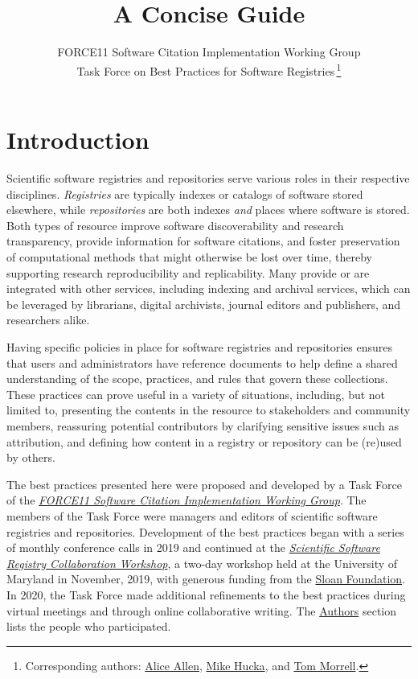 \documentclass[11pt]{article}
\title{\textls[-27]{Nine Best Practices for Research Software Registries and Repositories:}\\
A Concise Guide}
\author{FORCE11 Software Citation Implementation Working Group\\
Task Force on Best Practices for Software Registries$\,$\footnote{Corresponding authors: \href{mailto:aallen@ascl.net}{Alice Allen}, \href{mailto:mhucka@caltech.edu}{Mike Hucka}, and \href{mailto:tmorrell@library.caltech.edu}{Tom Morrell}.}}
\begin{document}
\maketitle
\thispagestyle{empty} %
\tableofcontents

\newcommand{\sectionbreak}{\clearpage}


\section{Introduction}
\label{introduction}

Scientific software registries and repositories serve various roles in their respective disciplines. \emph{Registries} are typically indexes or catalogs of software stored elsewhere, while \emph{repositories} are both indexes \emph{and} places where software is stored. Both types of resource improve software discoverability and research transparency, provide information for software citations, and foster preservation of computational methods that might otherwise be lost over time, thereby supporting research reproducibility and replicability. Many provide or are integrated with other services, including indexing and archival services, which can be leveraged by librarians, digital archivists, journal editors and publishers, and researchers alike.

Having specific policies in place for software registries and repositories ensures that users and administrators have reference documents to help define a shared understanding of the scope, practices, and rules that govern these collections. These practices can prove useful in a variety of situations, including, but not limited to, presenting the contents in the resource to stakeholders and community members, reassuring potential contributors by clarifying sensitive issues such as attribution, and defining how content in a registry or repository can be (re)used by others.

The best practices presented here were proposed and developed by a Task Force of the \href{https://github.com/force11/force11-sciwg}{\emph{FORCE11 Software Citation Implementation Working Group}}.  The members of the Task Force were managers and editors of scientific software registries and repositories.  Development of the best practices began with a series of monthly conference calls in 2019 and continued at the \href{https://asclnet.github.io/SWRegistryWorkshop/}{\emph{Scientific Software Registry Collaboration Workshop}}, a two-day workshop held at the University of Maryland in November, 2019, with generous funding from the \href{https://sloan.org}{Sloan Foundation}. In 2020, the Task Force made additional refinements to the best practices during virtual meetings and through online collaborative writing.  The \hyperref[authors]{Authors} section lists the people who participated.
\end{document}
